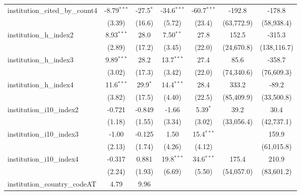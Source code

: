 \begin{tabular}{lcccccc}
   institution\_cited\_by\_count4        & -8.79$^{***}$ & -27.5$^{*}$   & -34.6$^{***}$ & -60.7$^{***}$ & -192.8     & -178.8\\   
                                         & (3.39)        & (16.6)        & (5.72)        & (23.4)        & (63,772.9) & (58,938.4)\\   
   institution\_h\_index2                & 8.93$^{***}$  & 28.0          & 7.50$^{**}$   & 27.8          & 152.5      & -315.3\\   
                                         & (2.89)        & (17.2)        & (3.45)        & (22.0)        & (24,670.8) & (138,116.7)\\   
   institution\_h\_index3                & 9.89$^{***}$  & 28.2          & 13.7$^{***}$  & 27.4          & 85.6       & -358.7\\   
                                         & (3.02)        & (17.3)        & (3.42)        & (22.0)        & (74,340.6) & (76,609.3)\\   
   institution\_h\_index4                & 11.6$^{***}$  & 29.9$^{*}$    & 14.4$^{***}$  & 28.4          & 333.2      & -89.2\\   
                                         & (3.82)        & (17.5)        & (4.40)        & (22.5)        & (85,409.9) & (33,500.8)\\   
   institution\_i10\_index2              & -0.721        & -0.849        & -1.66         & 5.39$^{*}$    & 39.2       & 30.4\\   
                                         & (1.18)        & (1.55)        & (3.34)        & (3.02)        & (33,056.4) & (42,737.1)\\   
   institution\_i10\_index3              & -1.00         & -0.125        & 1.50          & 15.4$^{***}$  &            & 159.9\\   
                                         & (2.13)        & (1.74)        & (4.26)        & (4.12)        &            & (61,015.8)\\   
   institution\_i10\_index4              & -0.317        & 0.881         & 19.8$^{***}$  & 34.6$^{***}$  & 175.4      & 210.9\\   
                                         & (2.24)        & (1.93)        & (6.69)        & (5.50)        & (54,057.0) & (83,601.2)\\   
   institution\_country\_codeAT          & 4.79          & 9.96          &               &               &            &   \\   

\end{tabular}
